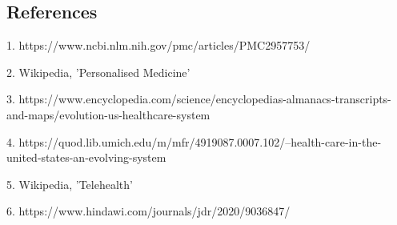 \documentclass[11pt]{article}
\begin{document}
\subsection*{References}

1. https://www.ncbi.nlm.nih.gov/pmc/articles/PMC2957753/

2. Wikipedia, 'Personalised Medicine'

3. https://www.encyclopedia.com/science/encyclopedias-almanacs-transcripts-and-maps/evolution-us-healthcare-system

4. https://quod.lib.umich.edu/m/mfr/4919087.0007.102/--health-care-in-the-united-states-an-evolving-system

5. Wikipedia, 'Telehealth'

6. https://www.hindawi.com/journals/jdr/2020/9036847/
\end{document}
